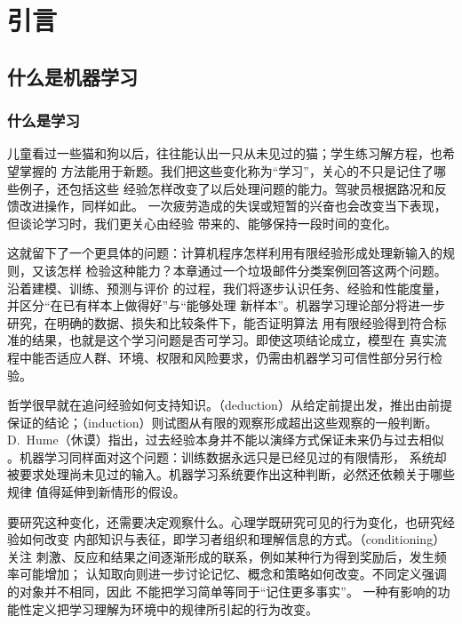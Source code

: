 \chapter{引言}
\label{chap:introduction}

\section{什么是机器学习}
\label{sec:what-is-machine-learning}

\subsection{什么是学习}

儿童看过一些猫和狗以后，往往能认出一只从未见过的猫；学生练习解方程，也希望掌握的
方法能用于新题。我们把这些变化称为“学习”，关心的不只是记住了哪些例子，还包括这些
经验怎样改变了以后处理问题的能力。驾驶员根据路况和反馈改进操作，同样如此。
一次疲劳造成的失误或短暂的兴奋也会改变当下表现，但谈论学习时，我们更关心由经验
带来的、能够保持一段时间的变化。

这就留下了一个更具体的问题：计算机程序怎样利用有限经验形成处理新输入的规则，又该怎样
检验这种能力？本章通过一个垃圾邮件分类案例回答这两个问题。沿着建模、训练、预测与评价
的过程，我们将逐步认识任务、经验和性能度量，并区分“在已有样本上做得好”与“能够处理
新样本”。机器学习理论部分将进一步研究，在明确的数据、损失和比较条件下，能否证明算法
用有限经验得到符合标准的结果，也就是这个学习问题是否可学习。即使这项结论成立，模型在
真实流程中能否适应人群、环境、权限和风险要求，仍需由机器学习可信性部分另行检验。

哲学很早就在追问经验如何支持知识。（deduction）从给定前提出发，推出由前提
保证的结论；（induction）则试图从有限的观察形成超出这些观察的一般判断。
D.~Hume（休谟）指出，过去经验本身并不能以演绎方式保证未来仍与过去相似
。机器学习同样面对这个问题：训练数据永远只是已经见过的有限情形，
系统却被要求处理尚未见过的输入。机器学习系统要作出这种判断，必然还依赖关于哪些规律
值得延伸到新情形的假设。

要研究这种变化，还需要决定观察什么。心理学既研究可见的行为变化，也研究经验如何改变
内部知识与表征，即学习者组织和理解信息的方式。（conditioning）关注
刺激、反应和结果之间逐渐形成的联系，例如某种行为得到奖励后，发生频率可能增加；
认知取向则进一步讨论记忆、概念和策略如何改变。不同定义强调的对象并不相同，因此
不能把学习简单等同于“记住更多事实”。
一种有影响的功能性定义把学习理解为环境中的规律所引起的行为改变。


